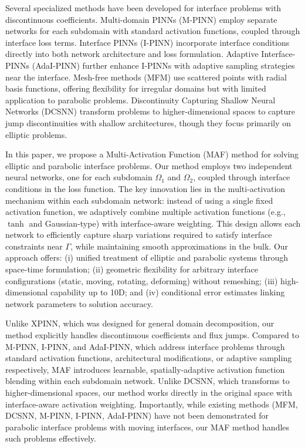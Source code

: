 \documentclass{article}
\begin{document}
Several specialized methods have been developed for interface problems with discontinuous coefficients. Multi-domain PINNs (M-PINN) \cite{zhang2022multi} employ separate networks for each subdomain with standard activation functions, coupled through interface loss terms. Interface PINNs (I-PINN) \cite{sarma2024interface} incorporate interface conditions directly into both network architecture and loss formulation. Adaptive Interface-PINNs (AdaI-PINN) \cite{roy2024adaptive} further enhance I-PINNs with adaptive sampling strategies near the interface. Mesh-free methods (MFM) \cite{he2022mesh} use scattered points with radial basis functions, offering flexibility for irregular domains but with limited application to parabolic problems. Discontinuity Capturing Shallow Neural Networks (DCSNN) \cite{hu2022discontinuity, tseng2023cusp} transform problems to higher-dimensional spaces to capture jump discontinuities with shallow architectures, though they focus primarily on elliptic problems.

In this paper, we propose a Multi-Activation Function (MAF) method for solving elliptic and parabolic interface problems. Our method employs two independent neural networks, one for each subdomain $\Omega_1$ and $\Omega_2$, coupled through interface conditions in the loss function. The key innovation lies in the multi-activation mechanism within each subdomain network: instead of using a single fixed activation function, we adaptively combine multiple activation functions (e.g., $\tanh$ and Gaussian-type) with interface-aware weighting. This design allows each network to efficiently capture sharp variations required to satisfy interface constraints near $\Gamma$, while maintaining smooth approximations in the bulk. Our approach offers: (i) unified treatment of elliptic and parabolic systems through space-time formulation; (ii) geometric flexibility for arbitrary interface configurations (static, moving, rotating, deforming) without remeshing; (iii) high-dimensional capability up to 10D; and (iv) conditional error estimates linking network parameters to solution accuracy.

Unlike XPINN, which was designed for general domain decomposition, our method explicitly handles discontinuous coefficients and flux jumps. Compared to M-PINN, I-PINN, and AdaI-PINN, which address interface problems through standard activation functions, architectural modifications, or adaptive sampling respectively, MAF introduces learnable, spatially-adaptive activation function blending within each subdomain network. Unlike DCSNN, which transforms to higher-dimensional spaces, our method works directly in the original space with interface-aware activation weighting. Importantly, while existing methods (MFM, DCSNN, M-PINN, I-PINN, AdaI-PINN) have not been demonstrated for parabolic interface problems with moving interfaces, our MAF method handles such problems effectively.
\end{document}
